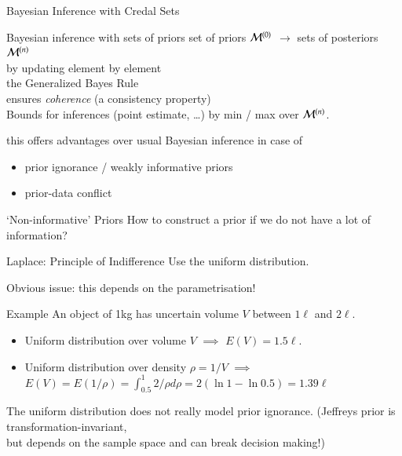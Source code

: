 \documentclass{beamer}
\begin{document}
\begin{frame}{Bayesian Inference with Credal Sets}
\begin{block}{Bayesian inference with sets of priors}
set of priors $\mathcal{M}^{(0)}$ $\to$ sets of posteriors $\mathcal{M}^{(n)}$\\
by updating element by element\\[1ex]
the Generalized Bayes Rule \parencite[GBR,][]{1991:walley}\\
ensures \emph{coherence} (a consistency property)\\[1ex]
Bounds for inferences (point estimate, \ldots) by min / max over $\mathcal{M}^{(n)}$.
\end{block}
this offers advantages over usual Bayesian inference in case of
\begin{itemize}
\item prior ignorance / weakly informative priors
\item prior-data conflict
\end{itemize}
\end{frame}

\begin{frame}{`Non-informative' Priors}
  How to construct a prior if we do not have a lot of information?
  \begin{alertblock}{Laplace: Principle of Indifference}
    Use the uniform distribution.
  \end{alertblock}
  Obvious issue: this depends on the parametrisation!
  \begin{exampleblock}{Example}
    An object of 1kg has uncertain volume $V$ between $1\ell$ and $2\ell$.
    \begin{itemize}
    \item Uniform distribution over volume $V$ $\implies$ $E(V)=1.5\ell$.
    \item Uniform distribution over density $\rho=1/V$ $\implies$ \\
      $E(V)=E(1/\rho)=\int_{0.5}^1 2/\rho d\rho=2(\ln 1-\ln 0.5)=1.39\ell$
    \end{itemize}
  \end{exampleblock}
  \alert{The uniform distribution does not really model prior ignorance.}
  (Jeffreys prior is transformation-invariant,\\ but depends on the sample space and can break decision making!)
\end{frame}
\end{document}
